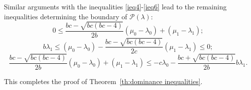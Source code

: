 \documentclass{amsart}
\newtheorem{lemma}[theorem]{Lemma}
\numberwithin{theorem}{section}
\newcommand{\cC}{\mathcal{C}}
\newcommand{\cI}{\mathcal{I}}
\newcommand{\cP}{\mathcal{P}}
\newcommand{\RR}{\mathbb{R}}
\begin{document}
  Similar arguments with the inequalities \eqref{ieq4}-\eqref{ieq6} lead to the remaining inequalities determining the boundary of $\cP(\lambda)$:
  \[ 0 \le \frac{bc-\sqrt{bc(bc-4)}}{2b}(\mu_0-\lambda_0)+(\mu_1-\lambda_1);\]
  \[ b\lambda_1 \le (\mu_0-\lambda_0)-\frac{bc-\sqrt{bc(bc-4)}}{2c}(\mu_1-\lambda_1) \le 0;\]
  \[ \frac{bc-\sqrt{bc(bc-4)}}{2b}(\mu_0-\lambda_0)+(\mu_1-\lambda_1) \le -c\lambda_0-\frac{bc+\sqrt{bc(bc-4)}}{2b}b\lambda_1.\]

  This completes the proof of Theorem~\ref{th:dominance inequalities}.
\end{document}

